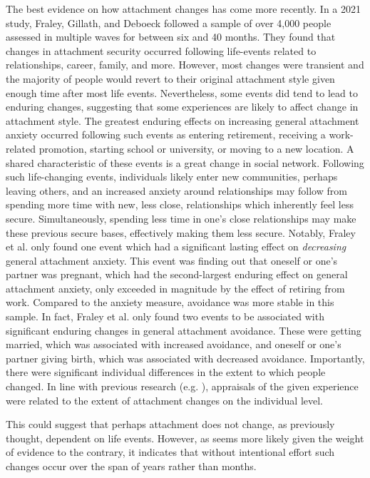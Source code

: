 \documentclass[12pt]{report}
\begin{document}
The best evidence on how attachment changes has come more recently. In a 2021 study, Fraley, Gillath, and Deboeck followed a sample of over 4,000 people assessed in multiple waves for between six and 40 months. They found that changes in attachment security occurred following life-events related to relationships, career, family, and more. However, most changes were transient and the majority of people would revert to their original attachment style given enough time after most life events.
Nevertheless, some events did tend to lead to enduring changes, suggesting that some experiences are likely to affect change in attachment style.
The greatest enduring effects on increasing general attachment anxiety occurred following such events as entering retirement, receiving a work-related promotion, starting school or university, or moving to a new location. A shared characteristic of these events is a great change in social network. Following such life-changing events, individuals likely enter new communities, perhaps leaving others, and an increased anxiety around relationships may follow from spending more time with new, less close, relationships which inherently feel less secure. Simultaneously, spending less time in one's close relationships may make these previous secure bases, effectively making them less secure.
Notably, Fraley et al. only found one event which had a significant lasting effect on \textit{decreasing} general attachment anxiety. This event was finding out that oneself or one's partner was pregnant, which had the second-largest enduring effect on general attachment anxiety, only exceeded in magnitude by the effect of retiring from work.
Compared to the anxiety measure, avoidance was more stable in this sample. In fact, Fraley et al. only found two events to be associated with significant enduring changes in general attachment avoidance. These were getting married, which was associated with increased avoidance, and oneself or one's partner giving birth, which was associated with decreased avoidance.
Importantly, there were significant individual differences in the extent to which people changed. In line with previous research (e.g. \cite{Zhang2004}), appraisals of the given experience were related to the extent of attachment changes on the individual level.


This could suggest that perhaps attachment does not change, as previously thought, dependent on life events. However, as seems more likely given the weight of evidence to the contrary, it indicates that without intentional effort such changes occur over the span of years rather than months.
\end{document}
